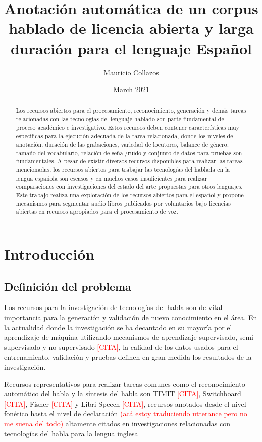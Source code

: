 \documentclass[a4paper,12pt,twoside]{report}
\title{Anotación automática de un corpus hablado de licencia abierta y larga duración para el lenguaje Español}
\author{Mauricio Collazos}
\date{March 2021}
\begin{document}
\maketitle

\begin{abstract}
    Los recursos abiertos para el procesamiento, reconocimiento, generación y demás tareas relacionadas con las tecnologías del lenguaje hablado son parte fundamental del proceso académico e investigativo. Estos recursos deben contener características muy específicas para la ejecución adecuada de la tarea relacionada, donde los niveles de anotación, duración de las grabaciones, variedad de locutores, balance de género, tamaño del vocabulario, relación de señal/ruido y conjunto de datos para pruebas son fundamentales. A pesar de existir diversos recursos disponibles para realizar las tareas mencionadas, los recursos abiertos para trabajar las tecnologías del hablada en la lengua española son escasos y en muchos casos insuficientes para realizar comparaciones con investigaciones del estado del arte propuestas para otros lenguajes. Este trabajo realiza una exploración de los recursos abiertos para el español y propone mecanismos para segmentar audio libros publicados por voluntarios bajo licencias abiertas en recursos apropiados para el procesamiento de voz.
\end{abstract}


\chapter{Introducción}

\section{Definición del problema}

Los recursos para la investigación de tecnologías del habla son de vital importancia para la generación y validación de nuevo conocimiento en el área. En la actualidad donde la investigación se ha decantado en su mayoría por el aprendizaje de máquina utilizando mecanismos de aprendizaje supervisado, semi supervisado y no supervisado \textcolor{red}{[CITA]}, la calidad de los datos usados para el entrenamiento, validación y pruebas definen en gran medida los resultados de la investigación.

Recursos representativos para realizar tareas comunes como el reconocimiento automático del habla y la síntesis del habla son TIMIT \textcolor{red}{[CITA]}, Switchboard \textcolor{red}{[CITA]}, Fisher \textcolor{red}{[CITA]} y Libri Speech \textcolor{red}{[CITA]}, recursos anotados desde el nivel fonético hasta el nivel de declaración \textcolor{red}{(acá estoy traduciendo utterance pero no me suena del todo)} altamente citados en investigaciones relacionadas con tecnologías del habla para la lengua inglesa
\end{document}
